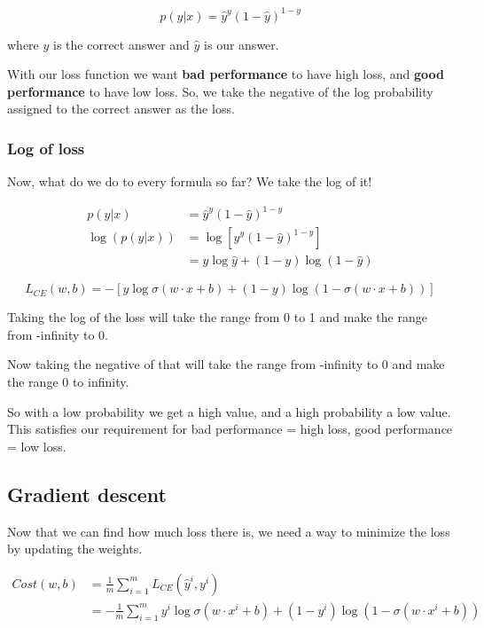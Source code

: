 \documentclass[11pt]{article}
\begin{document}
\[
	p(y|x) = \hat{y}^y (1-\hat{y})^{1-y}
\]

where $y$ is the correct answer and $\hat{y}$ is our answer.

With our loss function we want \textbf{bad performance} to have high loss, and
\textbf{good performance} to have low loss. So, we take the negative of the log
probability assigned to the correct answer as the loss.

\subsubsection*{Log of loss}

Now, what do we do to every formula so far? We take the log of it!

\begin{align*}
	p(y|x)       & = \hat{y}^y (1-\hat{y})^{1-y}          \\
	\log(p(y|x)) & = \log[\hat{y}^y (1-\hat{y})^{1-y}]    \\
	             & = y\log\hat{y} + (1-y) \log(1-\hat{y})
\end{align*}

\begin{equation*}
	L_{CE}(w,b) = -[y\log\sigma(w \cdot x + b) + (1-y) \log(1-\sigma(w \cdot x + b))]
\end{equation*}

Taking the log of the loss will take the range from 0 to 1 and make the range
from -infinity to 0.

Now taking the negative of that will take the range from -infinity to 0 and make
the range 0 to infinity.

So with a low probability we get a high value, and a high probability a low
value. This satisfies our requirement for bad performance = high loss, good
performance = low loss.

\subsection{Gradient descent}

Now that we can find how much loss there is, we need a way to minimize the loss
by updating the weights.

\begin{align*}
	Cost(w,b) & = \frac1m \sum_{i=1}^m L_{CE}(\hat{y}^i, y^i)                                                    \\
	          & = -\frac1m \sum_{i=1}^m y^i \log\sigma(w \cdot x^i + b) + (1-y^i)\log(1-\sigma(w \cdot x^i + b))
\end{align*}
\end{document}
